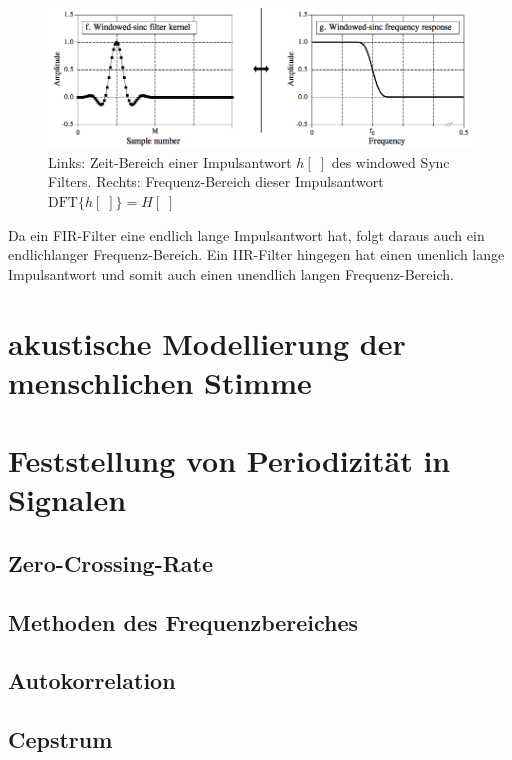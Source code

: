 \begin{figure}[h]
	\centering
	\includegraphics[width=1\textwidth]{bilder/lowPassFilter.png}
	\caption{Links: Zeit-Bereich einer Impulsantwort $h[\;]$ des \glqq windowed Sync Filters\grqq. Rechts: Frequenz-Bereich dieser Impulsantwort $\text{DFT}\{h[\;]\} = H[\;]$ \cite[S. 287]{dspGuide}}
	\label{img:convolutionExample}
\end{figure}

Da ein FIR-Filter eine endlich lange Impulsantwort hat, folgt daraus auch ein endlichlanger Frequenz-Bereich. Ein IIR-Filter hingegen hat einen unenlich lange Impulsantwort und somit auch einen unendlich langen Frequenz-Bereich.




\section{akustische Modellierung der menschlichen Stimme}
\section{Feststellung von Periodizität in Signalen}
\subsection{Zero-Crossing-Rate}
\subsection{Methoden des Frequenzbereiches}
\subsection{Autokorrelation}
\subsection{Cepstrum}